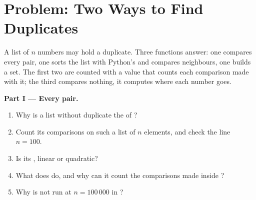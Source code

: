 \section{Problem: Two Ways to Find Duplicates}\label{sec:g11:cost-of-an-algorithm:problem}

\begin{problem}\label{pb:g11:cost-of-an-algorithm:1}
A list of $n$ numbers may hold a duplicate. Three functions answer: one compares every pair, one sorts the list with
Python's  and compares neighbours, one builds a set. The first two are counted with a value that counts
each comparison made with it; the third compares nothing, it computes where each number goes.

\label{lst:g11:cost-of-an-algorithm:duplicates}

\label{lst:g11:cost-of-an-algorithm:dup-count}

\label{out:g11:cost-of-an-algorithm:dup-count}

\label{lst:g11:cost-of-an-algorithm:dup-measure}

\label{out:g11:cost-of-an-algorithm:dup-measure}

\medskip\noindent\textbf{Part I --- Every pair.}
\begin{enumerate}
  \item Why is a list without duplicate the  of ?
  \item Count its comparisons on such a list of $n$ elements, and check the line $n = 100$.
  \item Is its  , linear or quadratic?
  \item What does  do, and why can it count the comparisons made inside ?
  \item Why is  not run at $n = 100\,000$ in ?
\end{enumerate}


\end{problem}
